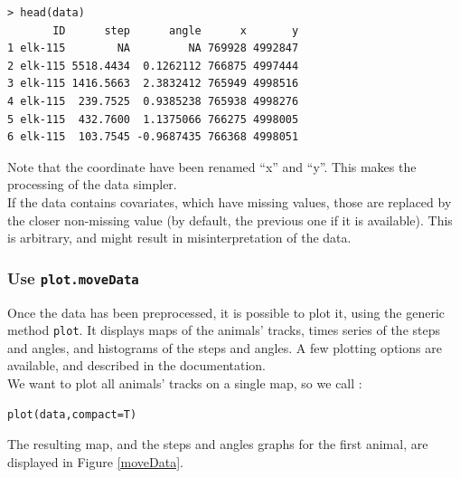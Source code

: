 \documentclass[]{article}
\begin{document}
\begin{lstlisting}
> head(data)
       ID      step      angle      x       y
1 elk-115        NA         NA 769928 4992847
2 elk-115 5518.4434  0.1262112 766875 4997444
3 elk-115 1416.5663  2.3832412 765949 4998516
4 elk-115  239.7525  0.9385238 765938 4998276
5 elk-115  432.7600  1.1375066 766275 4998005
6 elk-115  103.7545 -0.9687435 766368 4998051
\end{lstlisting}

Note that the coordinate have been renamed ``x'' and ``y''. This makes the processing of the data simpler.\\

If the data contains covariates, which have missing values, those are replaced by the closer non-missing value (by default, the previous one if it is available). This is arbitrary, and might result in misinterpretation of the data.

\subsubsection{Use \texttt{plot.moveData}}
Once the data has been preprocessed, it is possible to plot it, using the generic method \texttt{plot}. It displays maps of the animals' tracks, times series of the steps and angles, and histograms of the steps and angles. A few plotting options are available, and described in the documentation.\\

\noindent We want to plot all animals' tracks on a single map, so we call :

\begin{lstlisting}
plot(data,compact=T)
\end{lstlisting}

The resulting map, and the steps and angles graphs for the first animal, are displayed in Figure \ref{moveData}.
\end{document}
